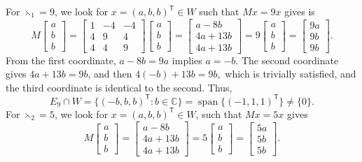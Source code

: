 \documentclass[12pt,twoside]{article}
\begin{document}
	For $\leftthreetimes_1=9$, we look for $x=(a,b,b)^{\mathsf T}\in W$ such that $Mx=9x$ gives is 
	$$
	M\begin{bmatrix}a\\ b\\ b\end{bmatrix}
	=
	\begin{bmatrix}
		1 & -4 & -4\\
		4 & 9 & 4\\
		4 & 4 & 9
	\end{bmatrix}
	\begin{bmatrix}a\\ b\\ b\end{bmatrix}
	=
	\begin{bmatrix}
		a-8b\\
		4a+13b\\
		4a+13b
	\end{bmatrix}
	=
	9\begin{bmatrix}a\\ b\\ b\end{bmatrix}
	=
	\begin{bmatrix}
		9a\\ 9b\\ 9b
	\end{bmatrix}.
	$$
	From the first coordinate, $a-8b = 9a$ implies $ a=-b.$ The second coordinate gives $4a+13b = 9b$, and then  $4(-b)+13b = 9b,$ which is trivially satisfied, and the third coordinate is identical to the second. Thus,
	$$
	E_9\cap W = \{(-b,b,b)^{\mathsf T} : b\in\mathbb{C}\}
	= \operatorname{span}\{(-1,1,1)^{\mathsf T}\}\neq\{0\}.
	$$
	For $\leftthreetimes_2=5$, we look for $x=(a,b,b)^{\mathsf T}\in W$, such that $Mx=5x$ gives
	$$
	M\begin{bmatrix}a\\ b\\ b\end{bmatrix}
	=
	\begin{bmatrix}
		a-8b\\
		4a+13b\\
		4a+13b
	\end{bmatrix}
	=
	5\begin{bmatrix}a\\ b\\ b\end{bmatrix}
	=
	\begin{bmatrix}
		5a\\ 5b\\ 5b
	\end{bmatrix}.
	$$
\end{document}
